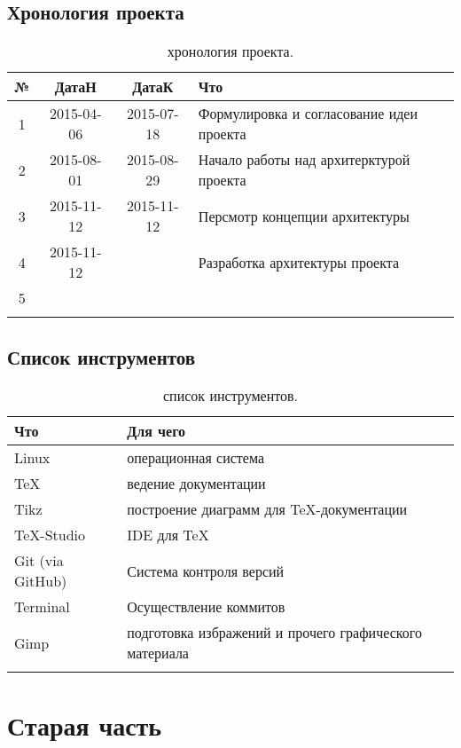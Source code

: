 \documentclass[12pt,a4paper,fullpage,titlepage]{article}
\begin{document}
\subsection{Хронология проекта}
\begin{table}[h]
\begin{tabularx}{\textwidth}{|c|c|c|X|}
	\hline
	№ & ДатаН & ДатаК & Что\\
	\hline
	1 & 2015-04-06 & 2015-07-18 & Формулировка и согласование идеи проекта \\
	\hline
	2 & 2015-08-01 & 2015-08-29 & Начало работы над архитерктурой проекта \\
	\hline
	3 & 2015-11-12 & 2015-11-12 & Персмотр концепции архитектуры \\
	\hline
	4 & 2015-11-12 &  & Разработка архитектуры проекта\\
	\hline
	5 &  &  &  \\
	\hline
	&  &  &  \\
	\hline
\end{tabularx}
\caption{хронология проекта.}
\end{table}

\subsection{Список инструментов}
\begin{table}[h]
	\begin{tabularx}{\textwidth}{|l|X|}
		\hline
		Что & Для чего \\
		\hline
		Linux & операционная система\\
		\hline
		\TeX & ведение документации\\
		\hline
		Tikz & построение диаграмм для \TeX-документации\\
		\hline
		\TeX-Studio & IDE для \TeX \\
		\hline
		Git (via GitHub) & Система контроля версий\\
		\hline
		Terminal & Осуществление коммитов\\
		\hline
		Gimp & подготовка избражений и прочего графического материала \\
		\hline
		& \\
		\hline
	\end{tabularx}
	\caption{список инструментов.}
\end{table}

\newpage

\section{Старая часть}
\end{document}
